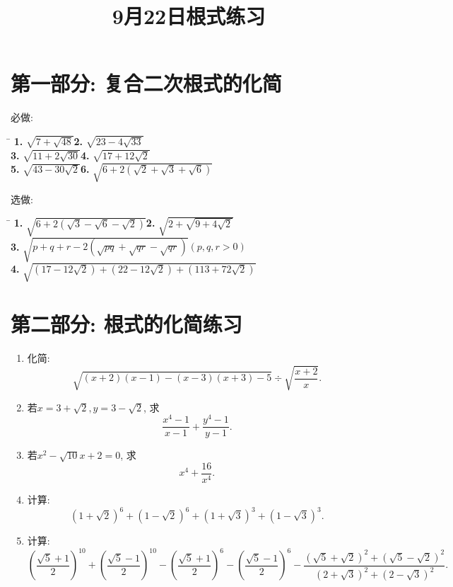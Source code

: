\documentclass{article}
\title{\vspace*{-3cm}\textbf{\heiti 9月22日根式练习}\vspace{-1cm}}
\date{}
\begin{document}
\maketitle
{\centering\section*{第一部分: 复合二次根式的化简}}
必做:
\begin{tabbing}
	\hspace*{0.5\textwidth}\=\kill
	\textbf{1. }$\displaystyle\sqrt{7+\sqrt{48}}$\>\textbf{2. }$\displaystyle\sqrt{23-4\sqrt{33}}$\\
	\textbf{3. }$\displaystyle\sqrt{11+2\sqrt{30}}$\>\textbf{4. }$\displaystyle\sqrt{17+12\sqrt{2}}$\\
	\textbf{5. }$\displaystyle\sqrt{43-30\sqrt2}$\>\textbf{6. }$\displaystyle\sqrt{6+2\left(\sqrt2+\sqrt3+\sqrt6\right)}$
\end{tabbing}\par
选做:
\begin{tabbing}
	\hspace*{0.5\textwidth}\=\kill
	\textbf{1. }$\displaystyle\sqrt{6+2\left(\sqrt3-\sqrt6-\sqrt2\right)}$\>\textbf{2. }$\displaystyle\sqrt{2+\sqrt{9+4\sqrt2}}$\\
	\textbf{3. }$\displaystyle\sqrt{p+q+r-2\left(\sqrt{pq}+\sqrt{qr}-\sqrt{qr}\right)}$\quad$(p,q,r>0)$\\
	\textbf{4. }$\displaystyle\sqrt{\left(17-12\sqrt2\right)+\left(22-12\sqrt2\right)+\left(113+72\sqrt2\right)}$
\end{tabbing}
{\centering\section*{第二部分: 根式的化简练习}}
\begin{enumerate}
	\renewcommand{\labelenumi}{\textbf{\theenumi. }}
	\item 化简: 
	\[\sqrt{(x+2)(x-1)-(x-3)(x+3)-5}\div\sqrt{\frac{x+2}{x}}.\]
	\item 若$x=3+\sqrt2, y=3-\sqrt2$, 求
	\[\frac{x^4-1}{x-1}+\frac{y^4-1}{y-1}.\]
	\item 若$x^2-\sqrt{10}x+2=0$, 求
	\[x^4+\frac{16}{x^4}.\]
	\item 计算:
	\[\left(1+\sqrt2\right)^6+\left(1-\sqrt2\right)^6+\left(1+\sqrt3\right)^3+\left(1-\sqrt3\right)^3.\]
	\item 计算:
	\[\left(\frac{\sqrt5+1}{2}\right)^{10}+\left(\frac{\sqrt5-1}{2}\right)^{10}-\left(\frac{\sqrt5+1}{2}\right)^6-\left(\frac{\sqrt5-1}{2}\right)^6-\frac{\left(\sqrt5+\sqrt2\right)^2+\left(\sqrt5-\sqrt2\right)^2}{\left(2+\sqrt3\right)^2+\left(2-\sqrt3\right)^2}.\]
\end{enumerate}
\end{document}

